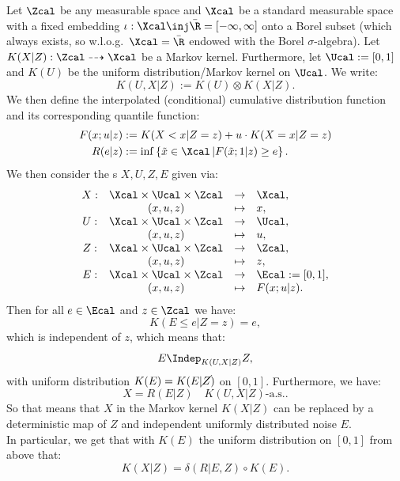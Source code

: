 \begin{Thm}
    \label{ccdf3}
    Let $\Zcal$ be any measurable space and $\Xcal$ be a standard measurable space with a fixed embedding $\iota: \Xcal \inj \bar\R=[-\infty,\infty]$ onto a Borel subset (which always exists, so w.l.o.g.\ $\Xcal = \bar\R$ endowed with the Borel $\sigma$-algebra).
    Let $K(X|Z) : \Zcal \dasharrow \Xcal$ be a Markov kernel.
    Furthermore, let $\Ucal:=[0,1]$ and $K(U)$ be the uniform distribution/Markov kernel on $\Ucal$. We write:
    \[ K(U,X|Z) := K(U)\otimes K(X|Z).\]
    We then define the interpolated (conditional) cumulative distribution function and its corresponding quantile function:
\begin{align*}
    F(x;u|z) &:= K(X<x|Z=z) + u \cdot K(X=x|Z=z)\\
	R(e|z) &:= \inf \left\{ \tilde{x} \in \Xcal\,| F(\tilde{x};1|z) \ge e \right\}.
\end{align*}
We then consider the \trv{}s $X,U,Z,E$ given via:
\[\begin{array}{cccl}
    X: & \Xcal \times \Ucal \times \Zcal &\to& \Xcal,\\
     & (x,u,z) &\mapsto& x,\\
    U: & \Xcal \times \Ucal \times \Zcal &\to& \Ucal,\\
     & (x,u,z) &\mapsto& u,\\
    Z: & \Xcal \times \Ucal \times \Zcal &\to& \Zcal,\\
     & (x,u,z) &\mapsto& z,\\
    E: & \Xcal \times \Ucal \times \Zcal &\to& \Ecal:=[0,1],\\
     & (x,u,z) &\mapsto& F(x;u|z).
\end{array}\]%
%
Then for all $e \in \Ecal$ and $z \in \Zcal$ we have:
\[ K( E \le e | Z=z ) = e, \]
which is independent of $z$, which means that:
\[  E \Indep_{K(U,X|Z)} Z,  \]
with uniform distribution $K(E) = K(E|\cancel{Z})$ on $[0,1]$. %
Furthermore, we have:
\[ X = R(E|Z) \quad K(U,X|Z)\text{-a.s.}.\]
So that means that $X$ in the Markov kernel $K(X|Z)$ can be replaced by a deterministic map of $Z$ and independent uniformly distributed noise $E$.\\
In particular, we get that with $K(E)$ the uniform distribution on $[0,1]$ from above that:
\[ K(X|Z) = \delta(R|E,Z) \circ K(E).\]
\end{Thm}

